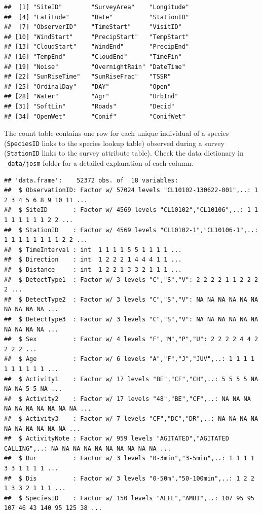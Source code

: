 \documentclass[12pt,]{book}
\newenvironment{Shaded}{\begin{snugshade}}{\end{snugshade}}
\newcommand{\KeywordTok}[1]{\textcolor[rgb]{0.13,0.29,0.53}{\textbf{#1}}}
\newcommand{\NormalTok}[1]{#1}
\newcommand{\OperatorTok}[1]{\textcolor[rgb]{0.81,0.36,0.00}{\textbf{#1}}}
\begin{document}
\begin{verbatim}
##  [1] "SiteID"        "SurveyArea"    "Longitude"    
##  [4] "Latitude"      "Date"          "StationID"    
##  [7] "ObserverID"    "TimeStart"     "VisitID"      
## [10] "WindStart"     "PrecipStart"   "TempStart"    
## [13] "CloudStart"    "WindEnd"       "PrecipEnd"    
## [16] "TempEnd"       "CloudEnd"      "TimeFin"      
## [19] "Noise"         "OvernightRain" "DateTime"     
## [22] "SunRiseTime"   "SunRiseFrac"   "TSSR"         
## [25] "OrdinalDay"    "DAY"           "Open"         
## [28] "Water"         "Agr"           "UrbInd"       
## [31] "SoftLin"       "Roads"         "Decid"        
## [34] "OpenWet"       "Conif"         "ConifWet"
\end{verbatim}

The count table contains one row for each unique individual
of a species (\texttt{SpeciesID} links to the species lookup table)
observed during a survey (\texttt{StationID} links to the survey attribute table).
Check the data dictionary in \texttt{\_data/josm} folder for a detailed explanation of each column.

\begin{Shaded}
\end{Shaded}

\begin{verbatim}
## 'data.frame':    52372 obs. of  18 variables:
##  $ ObservationID: Factor w/ 57024 levels "CL10102-130622-001",..: 1 2 3 4 5 6 8 9 10 11 ...
##  $ SiteID       : Factor w/ 4569 levels "CL10102","CL10106",..: 1 1 1 1 1 1 1 1 2 2 ...
##  $ StationID    : Factor w/ 4569 levels "CL10102-1","CL10106-1",..: 1 1 1 1 1 1 1 1 2 2 ...
##  $ TimeInterval : int  1 1 1 1 5 5 1 1 1 1 ...
##  $ Direction    : int  1 2 2 2 1 4 4 4 1 1 ...
##  $ Distance     : int  1 2 2 1 3 3 2 1 1 1 ...
##  $ DetectType1  : Factor w/ 3 levels "C","S","V": 2 2 2 2 1 1 2 2 2 2 ...
##  $ DetectType2  : Factor w/ 3 levels "C","S","V": NA NA NA NA NA NA NA NA NA NA ...
##  $ DetectType3  : Factor w/ 3 levels "C","S","V": NA NA NA NA NA NA NA NA NA NA ...
##  $ Sex          : Factor w/ 4 levels "F","M","P","U": 2 2 2 2 4 4 2 2 2 2 ...
##  $ Age          : Factor w/ 6 levels "A","F","J","JUV",..: 1 1 1 1 1 1 1 1 1 1 ...
##  $ Activity1    : Factor w/ 17 levels "BE","CF","CH",..: 5 5 5 5 NA NA NA 5 5 NA ...
##  $ Activity2    : Factor w/ 17 levels "48","BE","CF",..: NA NA NA NA NA NA NA NA NA NA ...
##  $ Activity3    : Factor w/ 7 levels "CF","DC","DR",..: NA NA NA NA NA NA NA NA NA NA ...
##  $ ActivityNote : Factor w/ 959 levels "AGITATED","AGITATED CALLING",..: NA NA NA NA NA NA NA NA NA NA ...
##  $ Dur          : Factor w/ 3 levels "0-3min","3-5min",..: 1 1 1 1 3 3 1 1 1 1 ...
##  $ Dis          : Factor w/ 3 levels "0-50m","50-100min",..: 1 2 2 1 3 3 2 1 1 1 ...
##  $ SpeciesID    : Factor w/ 150 levels "ALFL","AMBI",..: 107 95 95 107 46 43 140 95 125 38 ...
\end{verbatim}
\end{document}

